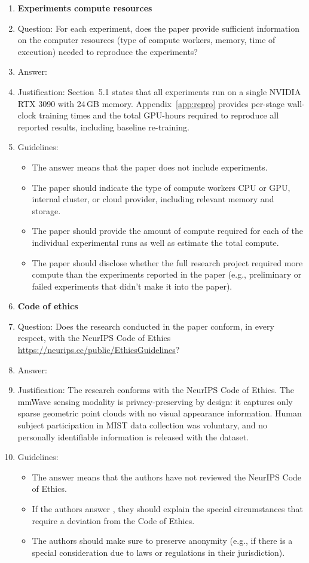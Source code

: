\begin{enumerate}
\item {\bf Experiments compute resources}
    \item[] Question: For each experiment, does the paper provide sufficient information on the computer resources (type of compute workers, memory, time of execution) needed to reproduce the experiments?
    \item[] Answer: \answerYes{}
    \item[] Justification: Section~5.1 states that all experiments run on a single NVIDIA RTX 3090 with 24\,GB memory. Appendix~\ref{app:repro} provides per-stage wall-clock training times and the total GPU-hours required to reproduce all reported results, including baseline re-training.
    \item[] Guidelines:
    \begin{itemize}
        \item The answer \answerNA{} means that the paper does not include experiments.
        \item The paper should indicate the type of compute workers CPU or GPU, internal cluster, or cloud provider, including relevant memory and storage.
        \item The paper should provide the amount of compute required for each of the individual experimental runs as well as estimate the total compute.
        \item The paper should disclose whether the full research project required more compute than the experiments reported in the paper (e.g., preliminary or failed experiments that didn't make it into the paper).
    \end{itemize}

\item {\bf Code of ethics}
    \item[] Question: Does the research conducted in the paper conform, in every respect, with the NeurIPS Code of Ethics \url{https://neurips.cc/public/EthicsGuidelines}?
    \item[] Answer: \answerYes{}
    \item[] Justification: The research conforms with the NeurIPS Code of Ethics. The mmWave sensing modality is privacy-preserving by design: it captures only sparse geometric point clouds with no visual appearance information. Human subject participation in MIST data collection was voluntary, and no personally identifiable information is released with the dataset.
    \item[] Guidelines:
    \begin{itemize}
        \item The answer \answerNA{} means that the authors have not reviewed the NeurIPS Code of Ethics.
        \item If the authors answer \answerNo, they should explain the special circumstances that require a deviation from the Code of Ethics.
        \item The authors should make sure to preserve anonymity (e.g., if there is a special consideration due to laws or regulations in their jurisdiction).
    \end{itemize}



\end{enumerate}
